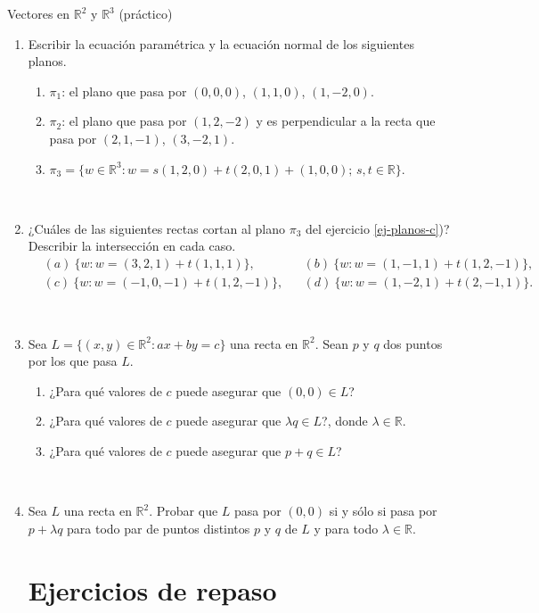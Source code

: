 \begin{chapter}{Vectores en $\mathbb R^2$ y $\mathbb R^3$ (práctico)}
\begin{enumerate}
\begin{comment}
\
\end{comment}



\item\label{ej-planos} Escribir la ecuaci{\'o}n paramétrica  y la ecuaci{\'o}n normal de los siguientes planos.
\begin{enumerate}
	\item $\pi_1$: el plano que pasa por $(0,0,0)$, $(1,1,0)$, $(1,-2,0)$.
	\item $\pi_2$: el plano que pasa por $(1,2,-2)$ y es perpendicular a la
	recta que pasa por $(2,1,-1)$, $(3,-2,1)$.
	\item\label{ej-planos-c}  $\pi_3=\{w\in\mathbb{R}^3: w=s(1,2,0)+t(2,0,1)+(1,0,0);\,s,t\in \mathbb R\}$.
\end{enumerate}

\


\item ¿Cu\'ales de las siguientes rectas cortan al plano $\pi_3$ del  ejercicio \ref{ej-planos-c})?
Describir la intersecci{\'o}n en cada caso.
\begin{align*}
&(a) \ \{w: w=(3,2,1)+t(1,1,1)\}, && (b) \  \{w: w=(1,-1,1)+t(1,2,-1)\}, \\
&(c)\  \{w: w=(-1,0,-1)+t(1,2,-1)\}, && (d) \  \{w: w=(1,-2,1)+t(2,-1,1)\}.
\end{align*}

\

\item Sea $L=\{(x,y)\in\mathbb{R}^2 : ax+by=c\}$ una recta en $\mathbb{R}^2$. Sean $p$ y $q$ dos puntos por los que pasa $L$.
\begin{enumerate}
 \item ¿Para qu\'e valores de $c$ puede asegurar que $(0,0)\in L$?
 \item ¿Para qu\'e valores de $c$ puede asegurar que $\lambda q\in L$?, donde $\lambda\in\mathbb{R}$.
 \item ¿Para qu\'e valores de $c$ puede asegurar que $p+q\in L$?
\end{enumerate}


\

\item Sea $L$ una recta en $\mathbb{R}^2$. Probar que $L$ pasa por $(0,0)$ si y s\'olo si pasa por $p+\lambda q$ para todo par de puntos distintos $p$ y $q$ de $L$ y para todo $\lambda\in\mathbb{R}$.


\section*{Ejercicios de repaso}


\end{enumerate}
\end{chapter}
